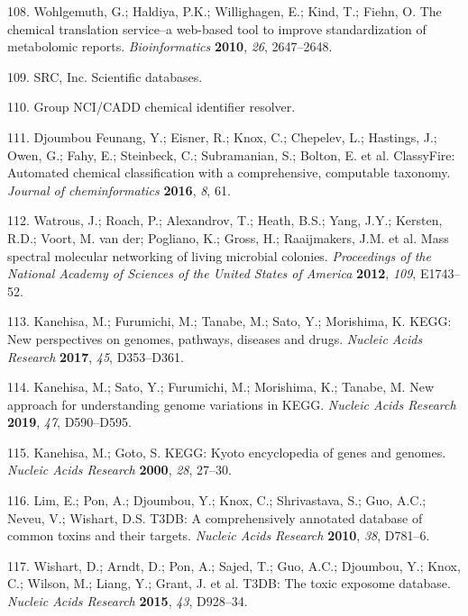 \documentclass[]{article}
\begin{document}
\leavevmode\hypertarget{ref-wohlgemuth_2010}{}%
108. Wohlgemuth, G.; Haldiya, P.K.; Willighagen, E.; Kind, T.; Fiehn, O. The chemical translation service--a web-based tool to improve standardization of metabolomic reports. \emph{Bioinformatics} \textbf{2010}, \emph{26}, 2647--2648.

\leavevmode\hypertarget{ref-srcinc_website_nd}{}%
109. SRC, Inc. Scientific databases.

\leavevmode\hypertarget{ref-ncicaddgroup_website_nd}{}%
110. Group NCI/CADD chemical identifier resolver.

\leavevmode\hypertarget{ref-djoumboufeunang_2016}{}%
111. Djoumbou Feunang, Y.; Eisner, R.; Knox, C.; Chepelev, L.; Hastings, J.; Owen, G.; Fahy, E.; Steinbeck, C.; Subramanian, S.; Bolton, E. et al. ClassyFire: Automated chemical classification with a comprehensive, computable taxonomy. \emph{Journal of cheminformatics} \textbf{2016}, \emph{8}, 61.

\leavevmode\hypertarget{ref-watrous_2012}{}%
112. Watrous, J.; Roach, P.; Alexandrov, T.; Heath, B.S.; Yang, J.Y.; Kersten, R.D.; Voort, M. van der; Pogliano, K.; Gross, H.; Raaijmakers, J.M. et al. Mass spectral molecular networking of living microbial colonies. \emph{Proceedings of the National Academy of Sciences of the United States of America} \textbf{2012}, \emph{109}, E1743--52.

\leavevmode\hypertarget{ref-kanehisa_2017}{}%
113. Kanehisa, M.; Furumichi, M.; Tanabe, M.; Sato, Y.; Morishima, K. KEGG: New perspectives on genomes, pathways, diseases and drugs. \emph{Nucleic Acids Research} \textbf{2017}, \emph{45}, D353--D361.

\leavevmode\hypertarget{ref-kanehisa_2019}{}%
114. Kanehisa, M.; Sato, Y.; Furumichi, M.; Morishima, K.; Tanabe, M. New approach for understanding genome variations in KEGG. \emph{Nucleic Acids Research} \textbf{2019}, \emph{47}, D590--D595.

\leavevmode\hypertarget{ref-kanehisa_2000}{}%
115. Kanehisa, M.; Goto, S. KEGG: Kyoto encyclopedia of genes and genomes. \emph{Nucleic Acids Research} \textbf{2000}, \emph{28}, 27--30.

\leavevmode\hypertarget{ref-lim_2010}{}%
116. Lim, E.; Pon, A.; Djoumbou, Y.; Knox, C.; Shrivastava, S.; Guo, A.C.; Neveu, V.; Wishart, D.S. T3DB: A comprehensively annotated database of common toxins and their targets. \emph{Nucleic Acids Research} \textbf{2010}, \emph{38}, D781--6.

\leavevmode\hypertarget{ref-wishart_2015}{}%
117. Wishart, D.; Arndt, D.; Pon, A.; Sajed, T.; Guo, A.C.; Djoumbou, Y.; Knox, C.; Wilson, M.; Liang, Y.; Grant, J. et al. T3DB: The toxic exposome database. \emph{Nucleic Acids Research} \textbf{2015}, \emph{43}, D928--34.
\end{document}

